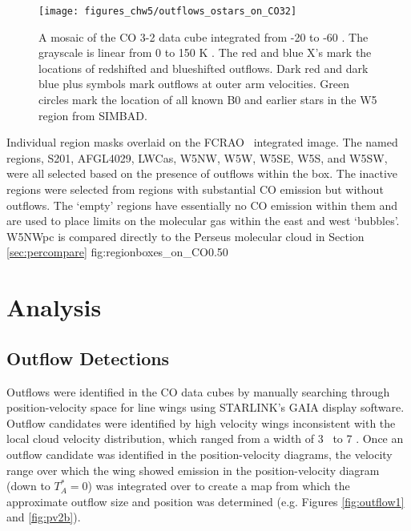 \begin{figure*}
  \texttt{[image: figures\_chw5/outflows\_ostars\_on\_CO32]}
  \caption{A mosaic of the CO 3-2 data cube integrated from -20 to -60 \kms.
  The grayscale is linear from 0 to 150 K \kms.  The red and blue X's mark the
  locations of redshifted and blueshifted outflows.  Dark red and dark blue
  plus symbols mark outflows at outer arm velocities.  Green circles mark the
  location of all known B0 and earlier stars in the W5 region from SIMBAD.}
  \label{fig:outflows_on_co32}
\end{figure*}

{Individual region masks overlaid on the FCRAO \twelveco\ integrated image.
The named regions, S201, AFGL4029, LWCas, W5NW, W5W, W5SE, W5S, and W5SW, were all
selected based on the presence of outflows within the box.
The inactive regions were selected from regions with substantial CO emission
but without outflows.  The `empty' regions have essentially no CO emission within
them and are used to place limits on the molecular gas within the east and west
`bubbles'.  W5NWpc is compared directly to the Perseus molecular cloud in 
Section \ref{sec:percompare}
}{fig:regionboxes_on_CO}{0.5}{0}


\section{Analysis}
\subsection{Outflow Detections}
Outflows were identified in the CO data cubes by manually searching through
position-velocity space for line wings using STARLINK's GAIA display software.  Outflow
candidates were identified by high velocity wings inconsistent with the local
cloud velocity distribution, which ranged from a width of 3 \kms\ to  7 \kms.
Once an outflow candidate was identified in the position-velocity diagrams, the
velocity range over which the wing showed emission in the position-velocity
diagram (down to $T_A^*=0$) was integrated over to create a map from which the
approximate outflow size and position was determined (e.g. Figures
\ref{fig:outflow1} and \ref{fig:pv2b}). 

